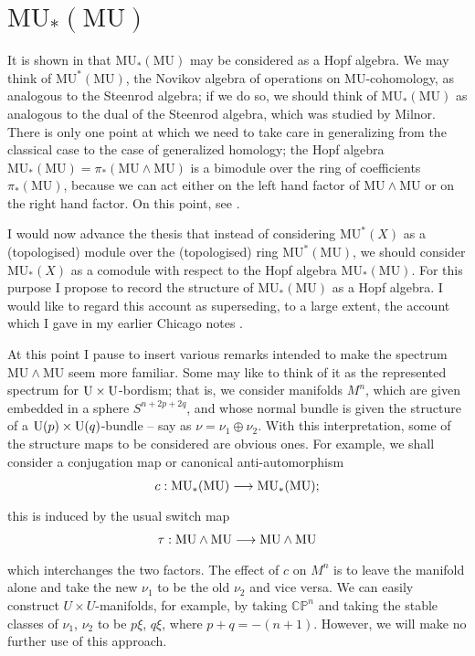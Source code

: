 \documentclass[../main]{subfiles}
\begin{document}
\chapter{\texorpdfstring{$\mathrm{MU}_\ast(\mathrm{MU})$}{MU(MU)}}
\label{sec:p2c11}
It is shown in \cite[Lecture 3, pp.~56-76]{adams3} that $\mathrm{MU}_\ast(\mathrm{MU})$ may be considered as a Hopf algebra. We may think of $\mathrm{MU}^\ast(\mathrm {MU})$, the Novikov algebra of operations on MU-cohomology, as analogous to the Steenrod algebra; if we do so, we should think of $\mathrm{MU}_\ast(\mathrm {MU})$ as analogous to the dual of the Steenrod algebra, which was studied by Milnor. \cite{milnor} There is only one point at which we need to take care in generalizing from the classical case to the case of generalized homology; the Hopf algebra $\mathrm{MU}_\ast(\mathrm {MU}) = \pi_\ast(\mathrm{MU} \wedge \mathrm{MU})$ is a bimodule over the ring of coefficients $\pi_\ast(\mathrm{MU})$, because we can act either on the left hand factor of $\mathrm{MU} \wedge \mathrm{MU}$ or on the right hand factor. On this point, see \cite[Lecture 3, pp.~59-60]{adams3}.

I would now advance the thesis that instead of considering $\mathrm{MU}^\ast(X)$ as a (topologised) module over the (topologised) ring $\mathrm {MU}^\ast(\mathrm{MU})$, we should consider $\mathrm{MU}_\ast(X)$ as a comodule with respect to the Hopf algebra $\mathrm{MU}_\ast(\mathrm{MU})$. For this purpose I propose to record the structure of $\mathrm{MU}_\ast(\mathrm{MU})$ as a Hopf algebra. I would like to regard this account as superseding, to a large extent, the account which I gave in my earlier Chicago notes \cite{adams2}.

At this point I pause to insert various remarks intended to make the spectrum $\mathrm{MU} \wedge \mathrm{MU}$ seem more familiar. Some may like to think of it as the represented spectrum for $\mathrm{U} \times \mathrm{U}$-bordism; that is, we consider manifolds $M^n$, which are given embedded in a sphere $S^{n + 2p + 2q}$, and whose normal bundle is given the structure of a $\mathrm{U}(p) \times \mathrm{U}(q)$-bundle -- say as $\nu = \nu_1 \oplus \nu_2$. With this interpretation, some of the structure maps to be considered are obvious ones. For example, we shall consider a conjugation map or canonical anti-automorphism
\[c: \mathrm{MU}_\ast(\mathrm{MU}) \lar{} \mathrm{MU}_\ast(\mathrm{MU});\]
this is induced by the usual switch map
\[\tau : \mathrm{MU} \wedge \mathrm{MU} \lar{} \mathrm{MU} \wedge \mathrm{MU}\]
which interchanges the two factors. The effect of $c$ on $M^n$ is to leave the manifold alone and take the new $\nu_1$ to be the old $\nu_2$ and vice versa. We can easily construct $U \times U$-manifolds, for example, by taking $\mathbb {CP}^n$ and taking the stable classes of $\nu_1$, $\nu_2$ to be $p \xi$, $q \xi$, where $p + q = -(n + 1)$. However, we will make no further use of this approach. 
\end{document}
